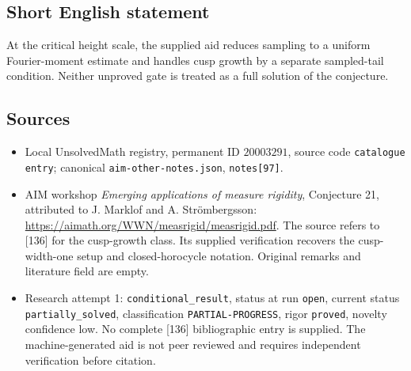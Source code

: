 \documentclass[11pt]{article}
\begin{document}
\subsection{Short English statement}
At the critical height scale, the supplied aid reduces sampling to a uniform Fourier-moment estimate and handles cusp growth by a separate sampled-tail condition. Neither unproved gate is treated as a full solution of the conjecture.
\subsection{Sources}
\begin{itemize}
\item Local UnsolvedMath registry, permanent ID $20003291$, source code \texttt{catalogue entry}; canonical \texttt{aim-other-notes.json}, \texttt{notes[97]}.
\item AIM workshop \emph{Emerging applications of measure rigidity}, Conjecture 21, attributed to J. Marklof and A. Str\"ombergsson: \url{https://aimath.org/WWN/measrigid/measrigid.pdf}. The source refers to [136] for the cusp-growth class. Its supplied verification recovers the cusp-width-one setup and closed-horocycle notation. Original remarks and literature field are empty.
\item Research attempt 1: \texttt{conditional\_result}, status at run \texttt{open}, current status \texttt{partially\_solved}, classification \texttt{PARTIAL-PROGRESS}, rigor \texttt{proved}, novelty confidence low. No complete [136] bibliographic entry is supplied. The machine-generated aid is not peer reviewed and requires independent verification before citation.
\end{itemize}
\end{document}
